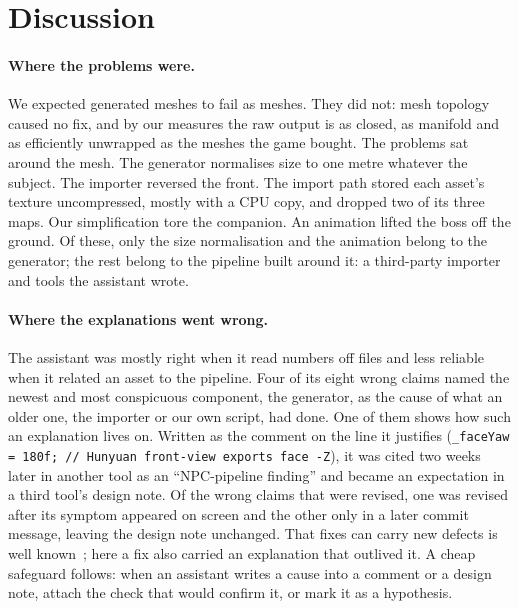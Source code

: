 \section{Discussion}
\label{sec:discussion}

\paragraph{Where the problems were.} We expected generated meshes to fail as
meshes. They did not: mesh topology caused no fix, and by our measures the raw
output is as closed, as manifold and as efficiently unwrapped as the meshes the
game bought. The problems sat around the mesh. The generator normalises size to
one metre whatever the subject. The importer reversed the front. The import path
stored each asset's texture uncompressed, mostly with a CPU copy, and dropped
two of its three maps. Our simplification tore the companion. An animation
lifted the boss off the ground. Of these, only the size normalisation and the
animation belong to the generator; the rest belong to the pipeline built around
it: a third-party importer and tools the assistant wrote.

\paragraph{Where the explanations went wrong.} The assistant was
mostly right when it read numbers off files and less reliable when it related an
asset to the pipeline. Four of its eight wrong claims named the newest and most
conspicuous component, the generator, as the cause of what an older one, the
importer or our own script, had done. One of them shows how such an explanation
lives on. Written as the comment on the line it justifies
(\texttt{\_faceYaw = 180f; // Hunyuan front-view exports face -Z}), it was cited
two weeks later in another tool as an ``NPC-pipeline finding'' and became an
expectation in a third tool's design note. Of the wrong claims that were
revised, one was revised after its symptom appeared on screen and the other only
in a later commit message, leaving the design note unchanged. That fixes can
carry new defects is well known~\cite{yin2011fixes}; here a fix also carried an
explanation that outlived it. A cheap safeguard follows: when an assistant
writes a cause into a comment or a design note, attach the check that would
confirm it, or mark it as a hypothesis.

